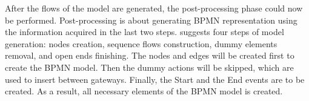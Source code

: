 After the flows of the model are generated, the post-processing phase could now be performed. Post-processing is about generating BPMN representation using the information acquired in the last two steps. \cite{t2m_1} suggests four steps of model generation: nodes creation, sequence flows construction, dummy elements removal, and open ends finishing. The nodes and edges will be created first to create the BPMN model. Then the dummy actions will be skipped, which are used to insert between gateways. Finally, the Start and the End events are to be created. As a result, all necessary elements of the BPMN model is created. 
